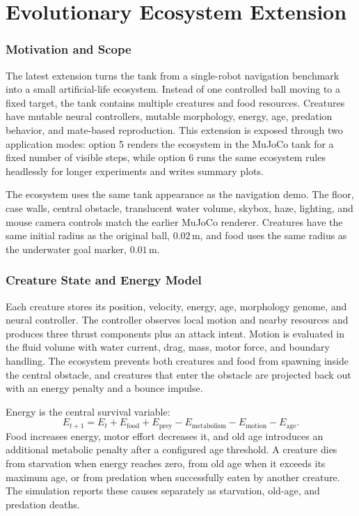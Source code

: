 \documentclass[12pt]{article}
\begin{document}
\clearpage
\part{Evolutionary Ecosystem Extension}

\section{Motivation and Scope}

The latest extension turns the tank from a single-robot navigation benchmark
into a small artificial-life ecosystem.  Instead of one controlled ball moving
to a fixed target, the tank contains multiple creatures and food resources.
Creatures have mutable neural controllers, mutable morphology, energy, age,
predation behavior, and mate-based reproduction.  This extension is exposed
through two application modes: option 5 renders the ecosystem in the MuJoCo tank
for a fixed number of visible steps, while option 6 runs the same ecosystem
rules headlessly for longer experiments and writes summary plots.

The ecosystem uses the same tank appearance as the navigation demo.  The floor,
case walls, central obstacle, translucent water volume, skybox, haze, lighting,
and mouse camera controls match the earlier MuJoCo renderer.  Creatures have
the same initial radius as the original ball, \(0.02\,\mathrm{m}\), and food
uses the same radius as the underwater goal marker, \(0.01\,\mathrm{m}\).

\section{Creature State and Energy Model}

Each creature stores its position, velocity, energy, age, morphology genome,
and neural controller.  The controller observes local motion and nearby
resources and produces three thrust components plus an attack intent.  Motion
is evaluated in the fluid volume with water current, drag, mass, motor force,
and boundary handling.  The ecosystem prevents both creatures and food from
spawning inside the central obstacle, and creatures that enter the obstacle are
projected back out with an energy penalty and a bounce impulse.

Energy is the central survival variable:
\[
E_{t+1}=E_t+E_{\mathrm{food}}+E_{\mathrm{prey}}
-E_{\mathrm{metabolism}}-E_{\mathrm{motion}}-E_{\mathrm{age}}.
\]
Food increases energy, motor effort decreases it, and old age introduces an
additional metabolic penalty after a configured age threshold.  A creature dies
from starvation when energy reaches zero, from old age when it exceeds its
maximum age, or from predation when successfully eaten by another creature.
The simulation reports these causes separately as starvation, old-age, and
predation deaths.
\end{document}
